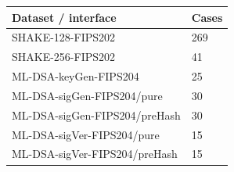 \begin{tabular}{ll}
\hline
Dataset / interface & Cases \\
\hline
SHAKE-128-FIPS202 & 269 \\
SHAKE-256-FIPS202 & 41 \\
ML-DSA-keyGen-FIPS204 & 25 \\
ML-DSA-sigGen-FIPS204/pure & 30 \\
ML-DSA-sigGen-FIPS204/preHash & 30 \\
ML-DSA-sigVer-FIPS204/pure & 15 \\
ML-DSA-sigVer-FIPS204/preHash & 15 \\
\hline
\end{tabular}
